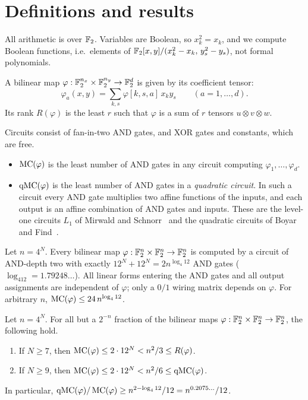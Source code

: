 \section{Definitions and results}

All arithmetic is over $\mathbb F_2$. Variables are Boolean, so $x_k^2=x_k$, and we compute Boolean functions, i.e.\ elements of $\mathbb F_2[x,y]/(x_k^2-x_k,\,y_s^2-y_s)$, not formal polynomials.

A bilinear map $\varphi:\mathbb F_2^{n_x}\times\mathbb F_2^{n_y}\to\mathbb F_2^{d}$ is given by its coefficient tensor:
\[
\varphi_a(x,y)=\sum_{k,s}\varphi[k,s,a]\,x_ky_s\qquad(a=1,\dots,d).
\]
Its rank $R(\varphi)$ is the least $r$ such that $\varphi$ is a sum of $r$ tensors $u\otimes v\otimes w$.

Circuits consist of fan-in-two AND gates, and XOR gates and constants, which are free.
\begin{itemize}
\item $\operatorname{MC}(\varphi)$ is the least number of AND gates in any circuit computing $\varphi_1,\dots,\varphi_d$.
\item $\operatorname{qMC}(\varphi)$ is the least number of AND gates in a \emph{quadratic circuit}. In such a circuit every AND gate multiplies two affine functions of the inputs, and each output is an affine combination of AND gates and inputs. These are the level-one circuits $L_1$ of Mirwald and Schnorr~\cite{MS92} and the quadratic circuits of Boyar and Find~\cite{BF18}.
\end{itemize}

\begin{theorem}\label{thm:frame}
Let $n=4^N$. Every bilinear map $\varphi:\mathbb F_2^n\times\mathbb F_2^n\to\mathbb F_2^n$ is computed by a circuit of AND-depth two with exactly $12^N+12^N=2n^{\log_4 12}$ AND gates ($\log_412=1.79248\ldots$). All linear forms entering the AND gates and all output assignments are independent of $\varphi$; only a $0/1$ wiring matrix depends on $\varphi$. For arbitrary $n$, $\operatorname{MC}(\varphi)\le 24\,n^{\log_4 12}$.
\end{theorem}

\begin{theorem}\label{thm:gap}
Let $n=4^N$. For all but a $2^{-n}$ fraction of the bilinear maps $\varphi:\mathbb F_2^n\times\mathbb F_2^n\to\mathbb F_2^n$, the following hold.
\begin{enumerate}
\item If $N\ge7$, then $\operatorname{MC}(\varphi)\le2\cdot12^N<n^2/3\le R(\varphi)$.
\item If $N\ge9$, then $\operatorname{MC}(\varphi)\le2\cdot12^N<n^2/6\le\operatorname{qMC}(\varphi)$.
\end{enumerate}
In particular, $\operatorname{qMC}(\varphi)/\operatorname{MC}(\varphi)\ge n^{2-\log_412}/12=n^{0.2075\ldots}/12$.
\end{theorem}

